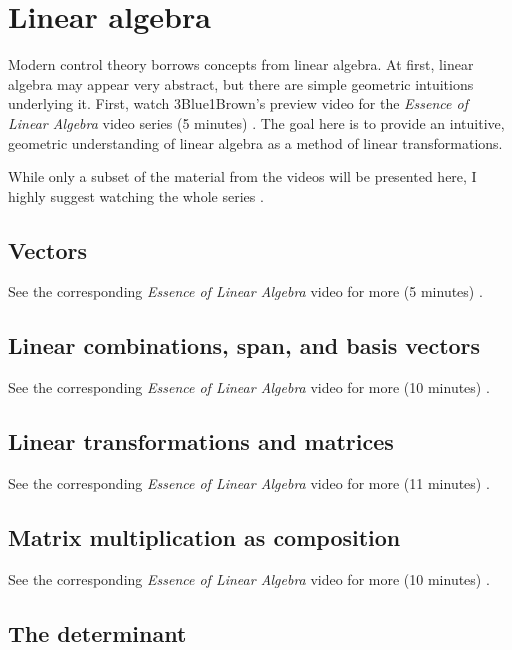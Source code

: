 \chapter{Linear algebra}

Modern control theory borrows concepts from linear algebra. At first, linear
algebra may appear very abstract, but there are simple geometric intuitions
underlying it. First, watch 3Blue1Brown's preview video for the
\textit{Essence of Linear Algebra} video series (5 minutes)
\cite{bib:linalg_preview}. The goal here is to provide an intuitive, geometric
understanding of linear algebra as a method of linear transformations.

While only a subset of the material from the videos will be presented here, I
highly suggest watching the whole series \cite{bib:essence_of_linalg}.

\section{Vectors}

See the corresponding \textit{Essence of Linear Algebra} video for more (5
minutes) \cite{bib:linalg_vectors}.

\section{Linear combinations, span, and basis vectors}

See the corresponding \textit{Essence of Linear Algebra} video for more (10
minutes) \cite{bib:linalg_linear_combinations}.

\section{Linear transformations and matrices}

See the corresponding \textit{Essence of Linear Algebra} video for more (11
minutes) \cite{bib:linalg_linear_transformations_and_matrices}.

\section{Matrix multiplication as composition}

See the corresponding \textit{Essence of Linear Algebra} video for more (10
minutes) \cite{bib:linalg_matrix_multiplication_as_composition}.

\section{The determinant}

